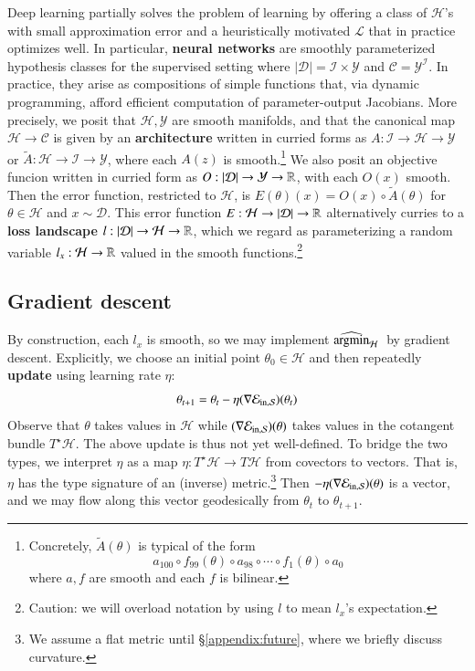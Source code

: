 \documentclass[openany, notitlepage, justified]{tufte-book}
\theoremstyle{plain}
\theoremstyle{definition}
\newcommand{\Cc}{\mathcal{C}}   \newcommand{\CC}{\mathbb{C}}
\newcommand{\Dd}{\mathcal{D}}
\newcommand{\Hh}{\mathcal{H}}
\newcommand{\Ii}{\mathcal{I}}
\newcommand{\Ll}{\mathcal{L}}
\newcommand{\Yy}{\mathcal{Y}}
\begin{document}
        Deep learning partially solves the problem of learning by offering a 
        class of $\Hh$'s with small approximation error and a heuristically
        motivated $\Ll$ that in practice optimizes well.  In particular, 
        \textbf{neural networks} are smoothly parameterized hypothesis classes
        for the supervised setting where $|\Dd| = \Ii\times \Yy$ and $\Cc =
        \Yy^\Ii$.  In practice, they arise as compositions of simple
        functions that, via dynamic programming, afford efficient computation of
        parameter-output Jacobians.  More precisely, we posit that $\Hh, \Yy$
        are smooth manifolds, and that the canonical map $\Hh\to\Cc$ is given
        by an \textbf{architecture} written in curried forms as $A:\Ii\to
        \Hh\to \Yy$ or $\tilde{A}:\Hh\to\Ii\to\Yy$, where each $A(z)$ is
        smooth.\footnote{
            Concretely, $\tilde{A}(\theta)$ is typical of the form
            $$
                a_{100} \circ f_{99}(\theta) \circ a_{98} \circ
                               \cdots \circ f_1(\theta) \circ a_0 
            $$
            where $a, f$ are smooth and each $f$ is bilinear.
        }  We also posit an objective funcion written in curried form as
        $O:|\Dd|\to\Yy\to\RR$, with each $O(x)$ smooth.  Then the error
        function, restricted to $\Hh$, is $E(\theta)(x) = O(x)\circ
        \tilde{A}(\theta)$ for $\theta\in \Hh$ and $x\sim \Dd$.  This error
        function $E:\Hh\to |\Dd|\to\RR$ alternatively curries to a \textbf{loss
        landscape} $l:|\Dd|\to\Hh\to\RR$, which we regard as parameterizing a
        random variable $l_x: \Hh\to\RR$ valued in the smooth
        functions.\footnote{
            Caution: we will overload notation by using $l$ to mean $l_x$'s 
            expectation.
        }

        \subsection{Gradient descent}

        By construction, each $l_x$ is smooth, so we may implement $\optH$ by
        gradient descent.  Explicitly, we choose an initial point $\theta_0\in \Hh$
        and then repeatedly \textbf{update} using learning rate $\eta$:
        $$
            \theta_{t+1} = \theta_t - \eta (\nabla \mathcal{E}_{\text{in},\mathcal{S}})(\theta_t) 
        $$
        Observe that $\theta$ takes values in $\Hh$ while $(\nabla \mathcal{E}_{\text{in},\mathcal{S}})(\theta)$ takes
        values in the cotangent bundle $T^\star\Hh$.  The above update is
        thus not yet well-defined.  To bridge the two types, we
        interpret $\eta$ as a map $\eta: T^\star\Hh\to T\Hh$ from
        covectors to vectors.  That is, $\eta$ has the type signature
        of an (inverse) metric.\footnote{
            We assume a flat metric until \S\ref{appendix:future}, where we
            briefly discuss curvature.
        } Then $-\eta (\nabla \mathcal{E}_{\text{in},\mathcal{S}})(\theta)$ is a vector, and we may flow along this
        vector geodesically from $\theta_t$ to $\theta_{t+1}$. 
\end{document}
